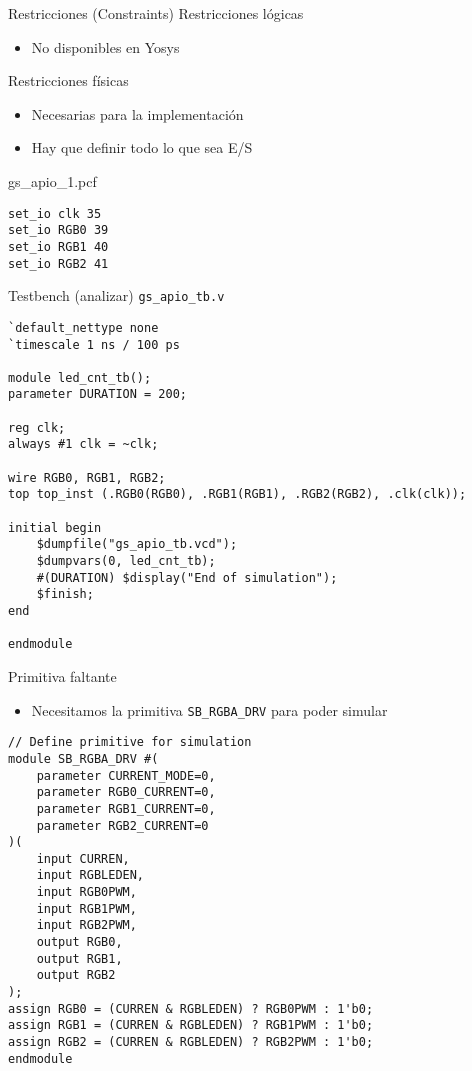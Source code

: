 \documentclass{beamer}
\begin{document}
\begin{frame}[fragile]{Restricciones (Constraints)}
Restricciones lógicas
\begin{itemize}
	\item No disponibles en Yosys
\end{itemize}
\vfill
Restricciones físicas
\begin{itemize}
	\item Necesarias para la implementación
	\item Hay que definir todo lo que sea E/S
\end{itemize}
\begin{block}{gs\_apio\_1.pcf}
\begin{lstlisting}
set_io clk 35
set_io RGB0 39
set_io RGB1 40
set_io RGB2 41
\end{lstlisting}
\end{block}
\end{frame}

\begin{frame}[fragile]{Testbench (analizar) \texttt{gs\_apio\_tb.v}}
\begin{center}\begin{adjustbox}{padding=2pt 0pt 0pt 0pt, cfbox=blue!50 1pt}\begin{lstlisting}
`default_nettype none
`timescale 1 ns / 100 ps

module led_cnt_tb();
parameter DURATION = 200;

reg clk;
always #1 clk = ~clk;

wire RGB0, RGB1, RGB2;
top top_inst (.RGB0(RGB0), .RGB1(RGB1), .RGB2(RGB2), .clk(clk));

initial begin
	$dumpfile("gs_apio_tb.vcd");
	$dumpvars(0, led_cnt_tb);
	#(DURATION) $display("End of simulation");
	$finish;
end

endmodule
\end{lstlisting}\end{adjustbox}\end{center}
\end{frame}

\begin{frame}[fragile]{Primitiva faltante}
\begin{itemize}
	\item Necesitamos la primitiva \texttt{SB\_RGBA\_DRV} para poder simular
\end{itemize}
\begin{center}\begin{adjustbox}{padding=2pt 0pt 0pt 0pt, cfbox=blue!50 1pt}\begin{lstlisting}
// Define primitive for simulation
module SB_RGBA_DRV #(
	parameter CURRENT_MODE=0,
	parameter RGB0_CURRENT=0,
	parameter RGB1_CURRENT=0,
	parameter RGB2_CURRENT=0
)(
	input CURREN,
	input RGBLEDEN,
	input RGB0PWM,
	input RGB1PWM,
	input RGB2PWM,
	output RGB0,
	output RGB1,
	output RGB2
);
assign RGB0 = (CURREN & RGBLEDEN) ? RGB0PWM : 1'b0;
assign RGB1 = (CURREN & RGBLEDEN) ? RGB1PWM : 1'b0;
assign RGB2 = (CURREN & RGBLEDEN) ? RGB2PWM : 1'b0;
endmodule
\end{lstlisting}\end{adjustbox}\end{center}
\end{frame}
\end{document}
